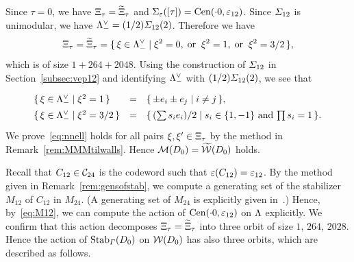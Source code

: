 \documentclass{amsart} %
\begin{document}
%
Since $\tau=0$,
we have $\Xi_{\tau}=\widetilde{\Xi}_{\tau}$ and $\Sigma_{\varepsilon}([\tau])=\mathrm{Cen}(\cdot 0, \varepsilon_{12})$.
Since  $\varSigma_{12}$ is unimodular,
we have $\Lambda_{-}^{\vee}= (1/2)\varSigma_{12}(2)$.
Therefore we have 
\[
\Xi_{\tau}=\widetilde{\Xi}_{\tau}=\{\,{\xi\in \Lambda_{-}^{\vee}}\mid {\xi^2=0, \;\textrm{or}\; \; \xi^2=1, \;\textrm{or}\; \; \xi^2=3/2} \,\},
\]
which is of size $1+264+2048$.
Using the construction of $\varSigma_{12}$ in Section~\ref{subsec:vep12} and 
identifying  $\Lambda_{-}^{\vee}$ with $ (1/2)\varSigma_{12}(2)$,
we see that 
\[
\renewcommand{\arraystretch}{1.4}
\begin{array}{lcl}
\set{\xi\in \Leechminus\dual}{\xi^2=1} &=& \set{\pm  e_i\pm  e_j}{i\ne j}, \\
\set{\xi\in \Leechminus\dual}{\xi^2=3/2} &=& \set{(\sum s_i e_i)/2}{\textrm{$s_i\in \{1, -1\}$ and $\prod s_i=1$}}. \\
\end{array}
\]
%
%
We prove~\eqref{eq:nnell} holds for all pairs $\xi, \xi^{\prime}\in \Xi_{\tau}$
by the method in Remark~\ref{rem:MMMtilwalls}.
Hence 
$\mathord{\mathcal{M}}(D_0)=\widetilde{\mathord{\mathcal{W}}}(D_0)$ holds.
%
\par 
%
Recall that $C_{12}\in \mathord{\mathcal{C}}_{24}$ is the codeword such that $\varepsilon(C_{12})=\varepsilon_{12}$. %
By the method given in Remark~\ref{rem:gensofstab}, 
we compute a generating set of 
the stabilizer $M_{12}$ of $C_{12}$ in $M_{24}$.
(A generating set of $M_{24}$ is explicitly given in~\cite[Chapter 10, Section 2]{theCSbook}.)
Hence, by~\eqref{eq:M12},
we can compute the action of $\mathrm{Cen}(\cdot 0, \varepsilon_{12})$ on $\Lambda$ explicitly.
We confirm that this action decomposes $\Xi_{\tau}=\widetilde{\Xi}_{\tau}$
into three orbit of size $1$, $264$, $2028$.
Hence the action of $\operatorname{Stab}_{\varGamma}(D_0)$ on $\mathord{\mathcal{W}}(D_0)$ 
has also three orbits,
which are described as follows.
%
\end{document}

